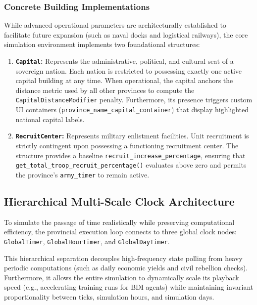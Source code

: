 \subsubsection{Concrete Building Implementations}
While advanced operational parameters are architecturally established to facilitate future expansion (such as naval docks and logistical railways), the core simulation environment implements two foundational structures:
\begin{enumerate}
    \item \textbf{\texttt{Capital}:} Represents the administrative, political, and cultural seat of a sovereign nation. Each nation is restricted to possessing exactly one active capital building at any time. When operational, the capital anchors the distance metric used by all other provinces to compute the \texttt{CapitalDistanceModifier} penalty. Furthermore, its presence triggers custom UI containers (\texttt{province\_name\_capital\_container}) that display highlighted national capital labels.
    \item \textbf{\texttt{RecruitCenter}:} Represents military enlistment facilities. Unit recruitment is strictly contingent upon possessing a functioning recruitment center. The structure provides a baseline \texttt{recruit\_increase\_percentage}, ensuring that \texttt{get\_total\_troop\_recruit\_percentage()} evaluates above zero and permits the province's \texttt{army\_timer} to remain active.
\end{enumerate}

\subsection{Hierarchical Multi-Scale Clock Architecture}
\label{subsec:hierarchical_timers}

To simulate the passage of time realistically while preserving computational efficiency, the provincial execution loop connects to three global clock nodes: \texttt{GlobalTimer}, \texttt{GlobalHourTimer}, and \texttt{GlobalDayTimer}. 

This hierarchical separation decouples high-frequency state polling from heavy periodic computations (such as daily economic yields and civil rebellion checks). Furthermore, it allows the entire simulation to dynamically scale its playback speed (e.g., accelerating training runs for BDI agents) while maintaining invariant proportionality between ticks, simulation hours, and simulation days.

